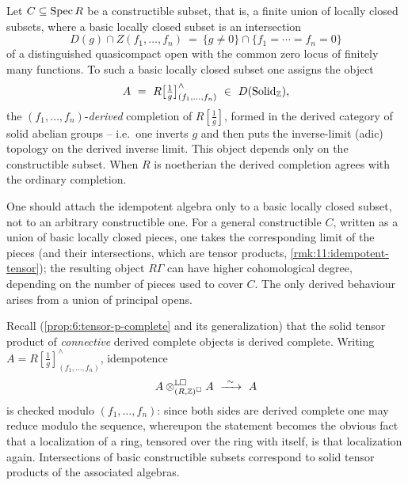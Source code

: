 \begin{definition}
\label{def:11:constructible-idempotent}
Let $C\subseteq\operatorname{Spec} R$ be a constructible subset, that is, a finite union of
locally closed subsets, where a basic locally closed subset is an intersection
\begin{equation*}
D(g)\cap Z(f_{1},\dots,f_{n})\ =\ \{g\neq 0\}\cap\{f_{1}=\cdots=f_{n}=0\}
\end{equation*}
of a distinguished quasicompact open with the common zero locus of finitely many
functions. To such a basic locally closed subset one assigns the object
\begin{equation*}
A\ =\ R\bigl[\tfrac1g\bigr]^{\wedge}_{(f_{1},\dots,f_{n})}\ \in\ D(\Solid_{
\mathbb{Z}}),
\end{equation*}
the $(f_{1},\dots,f_{n})$-\emph{derived} completion of $R[\tfrac1g]$, formed in
the derived category of solid abelian groups -- i.e.\ one inverts $g$ and then
puts the inverse-limit (adic) topology on the derived inverse limit. This object
depends only on the constructible subset. When $R$ is noetherian the derived
completion agrees with the ordinary completion.
\end{definition}

\begin{remark}
\label{rmk:11:only-locally-closed}
One should attach the idempotent algebra only to a basic locally closed subset,
not to an arbitrary constructible one. For a general constructible $C$, written
as a union of basic locally closed pieces, one takes the corresponding limit of
the pieces (and their intersections, which are tensor products,
\cref{rmk:11:idempotent-tensor}); the resulting object $R\Gamma$ can have higher
cohomological degree, depending on the number of pieces used to cover $C$. The
only derived behaviour arises from a union of principal opens.
\end{remark}

\begin{remark}[Idempotence]
\label{rmk:11:idempotent-tensor}
Recall (\cref{prop:6:tensor-p-complete} and its generalization) that the solid
tensor product of \emph{connective} derived complete objects is derived complete. Writing
$A=R[\tfrac1g]^{\wedge}_{(f_{1},\dots,f_{n})}$, idempotence
\begin{equation*}
A\otimes^{\mathbb{L}\solid}_{(R,\mathbb{Z})^{\solid}}A\ \xrightarrow{\ \sim\ }\ A
\end{equation*}
is checked modulo $(f_{1},\dots,f_{n})$: since both sides are derived complete
one may reduce modulo the sequence, whereupon the statement becomes the obvious
fact that a localization of a ring, tensored over the ring with itself, is that
localization again. Intersections of basic constructible subsets correspond to
solid tensor products of the associated algebras.
\end{remark}

